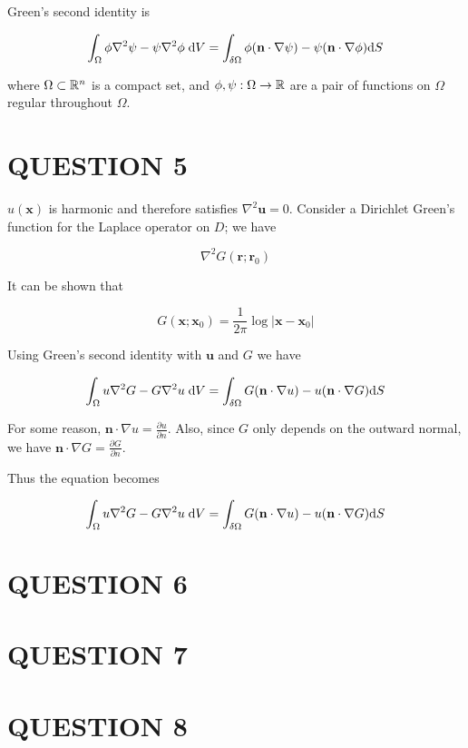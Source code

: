 \documentclass[a4paper]{article}
\begin{document}
Green's second identity is 

\[ \int_{\Omega}  \phi \nabla^{2} \psi  - \psi \nabla^{2} \phi \;  \mathrm{d} V = \int_{\delta \Omega} \phi ( \mathbf{n} \cdot \nabla \psi ) - \psi( \mathbf{n} \cdot \nabla \phi ) \mathrm{d} S   \]

where $ \Omega \subset \mathbb{R}^{n} $ is a compact set, and $ \phi, \psi : \Omega \to \mathbb{R} $ are a pair of functions on $ \Omega $ regular throughout $ \Omega $.

\section{QUESTION 5}

$ u(\mathbf{x}) $ is harmonic and therefore satisfies $ \nabla^{2} \mathbf{u} = 0 $. Consider a Dirichlet Green's function for the Laplace operator on $ D $; we have

\[ \nabla^{2} G ( \mathbf{r} ; \mathbf{r}_{0}) \]

It can be shown that

\[ G (\mathbf{x} ; \mathbf{x}_{0} ) = \frac{1}{2\pi} \log | \mathbf{x} - \mathbf{x}_{0} | \]

Using Green's second identity with $ \mathbf{u} $ and $ G $ we have

\[ \int_{\Omega}  u \nabla^{2} G  - G \nabla^{2} u \; \mathrm{d} V = \int_{\delta \Omega} G ( \mathbf{n} \cdot \nabla u ) - u ( \mathbf{n} \cdot \nabla G ) \mathrm{d} S   \]

For some reason, $ \mathbf{n} \cdot \nabla u = \frac{\partial u }{\partial n} $. Also, since $ G $ only depends on the outward normal, we have $ \mathbf{n} \cdot \nabla G =  \frac{\partial G }{\partial n} $.  

Thus the equation becomes 

\[ \int_{\Omega}  u \nabla^{2} G  - G \nabla^{2} u \; \mathrm{d} V = \int_{\delta \Omega} G ( \mathbf{n} \cdot \nabla u ) - u ( \mathbf{n} \cdot \nabla G ) \mathrm{d} S  \]



\section{QUESTION 6}



\section{QUESTION 7}



\section{QUESTION 8}
\end{document}
